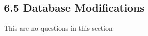\documentclass[../../main.tex]{subfiles}
\begin{document}
\subsection*{6.5 Database Modifications}

This are no questions in this section
\end{document}
